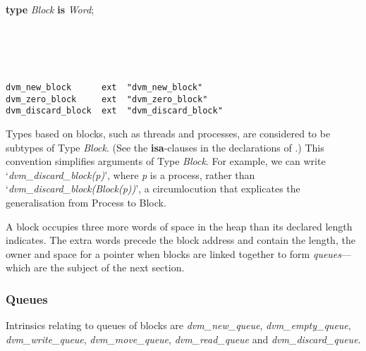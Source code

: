 \begin{tabbing}
\indents
\vb\>\textbf{type} \emph{Block} \textbf{is} \emph{Word};\\
\\[-10pt]
\\[-10pt]
\\[-10pt]
\\[-30pt]
\end{tabbing}

{\small
\begin{verbatim}
dvm_new_block      ext  "dvm_new_block"
dvm_zero_block     ext  "dvm_zero_block"
dvm_discard_block  ext  "dvm_discard_block"
\end{verbatim}}

Types based on blocks, such as threads and processes, are considered to be subtypes of Type \emph{Block}. (See the \textbf{isa}-clauses in the declarations of .) This convention simplifies arguments of Type \emph{Block}. For example, we can write `\emph{dvm\_discard\_block(p)}', where \emph{p} is a process, rather than `\emph{dvm\_discard\_block(Block(p))}', a circumlocution that explicates the generalisation from Process to Block.

A block occupies three more words of space in the heap than its declared length indicates. The extra words precede the block address and contain the length, the owner and space for a pointer when blocks are linked together to form \emph{queues}---which are the subject of the next section.



\subsubsection{Queues}
Intrinsics relating to queues of blocks are \emph{dvm\_new\_queue}, \emph{dvm\_empty\_queue}, \emph{dvm\_write\_queue}, \emph{dvm\_move\_queue}, \emph{dvm\_read\_queue} and \emph{dvm\_discard\_queue}.

